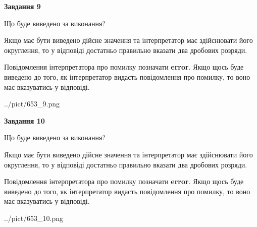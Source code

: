 \documentclass[12pt, ukrainian]{article}
\begin{document}
{\begin {Large}
{\begin {center}\textbf{Завдання 9}\end {center}}\par
Що буде виведено за виконання? \par

Якщо має бути виведено дійсне значення та інтерпретатор має здійснювати його округлення, 
то у відповіді достатньо правильно вказати два дробових розряди.

Повідомлення інтерпретатора про помилку позначати \textbf{error}.
Якщо щось буде виведено до того, як інтерпретатор видасть повідомлення про помилку, 
то воно має вказуватись у відповіді. \par

\begin{center}
	{../pict/653_9.png}
\end{center}
\newpage

{\begin {center}\textbf{Завдання 10}\end {center}}\par
Що буде виведено за виконання? \par

Якщо має бути виведено дійсне значення та інтерпретатор має здійснювати його округлення, 
то у відповіді достатньо правильно вказати два дробових розряди.

Повідомлення інтерпретатора про помилку позначати \textbf{error}.
Якщо щось буде виведено до того, як інтерпретатор видасть повідомлення про помилку, 
то воно має вказуватись у відповіді. \par

\begin{center}
	{../pict/653_10.png}
\end{center}
\newpage

\end {Large}}
\end{document}
